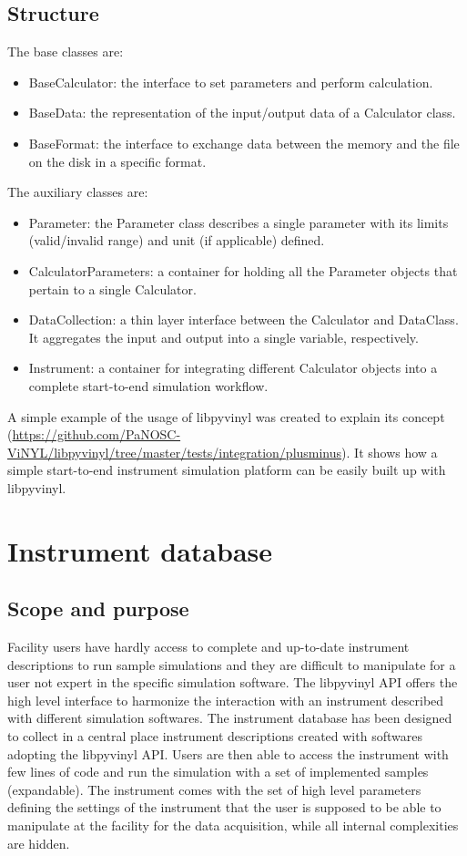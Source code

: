 \documentclass[11pt, a4paper]{article}
\begin{document}
\subsection{Structure}
\label{sec:lpv_structure}

The base classes are:
\begin{itemize}
    \item BaseCalculator: the interface to set parameters and perform calculation.
    \item BaseData: the representation of the input/output data of a Calculator class.
    \item BaseFormat: the interface to exchange data between the memory and the file on the disk in a specific format.
\end{itemize}

The auxiliary classes are:
\begin{itemize}
    \item Parameter: the Parameter class describes a single parameter with its limits (valid/invalid range) and unit (if applicable) defined.
    \item CalculatorParameters: a container for holding all the Parameter objects that pertain to a single Calculator.
    \item DataCollection: a thin layer interface between the Calculator and DataClass. It aggregates the input and output into a single variable, respectively.
    \item Instrument: a container for integrating different Calculator objects into a complete start-to-end simulation workflow.
\end{itemize}

A simple example of the usage of libpyvinyl was created to explain its concept (\url{https://github.com/PaNOSC-ViNYL/libpyvinyl/tree/master/tests/integration/plusminus}). It shows how a simple start-to-end instrument simulation platform can be easily built up with libpyvinyl.

\section{Instrument database}
\subsection{Scope and purpose}
Facility users have hardly access to complete and up-to-date instrument descriptions to run sample simulations and they are difficult to manipulate for a user not expert in the specific simulation software. 
The libpyvinyl API offers the high level interface to harmonize the interaction with an instrument described with different simulation softwares.
The instrument database has been designed to collect in a central place instrument descriptions created with softwares adopting the libpyvinyl API. Users are then able to access the instrument with few lines of code and run the simulation with a set of implemented samples (expandable). The instrument comes with the set of high level parameters defining the settings of the instrument that the user is supposed to be able to manipulate at the facility for the data acquisition, while all internal complexities are hidden.
\end{document}
